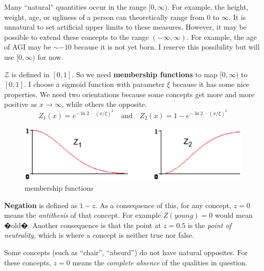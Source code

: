 Many ``natural'' quantities occur in the range $[0,\infty)$.  For example, the height, weight, age, or ugliness of a person can theoretically range from 0 to $\infty$.  It is unnatural to set artificial upper limits to these measures.  However, it may be possible to extend these concepts to the range $(-\infty,\infty)$.  For example, the age of AGI may be $\sim-10$ because it is not yet born.  I reserve this possibility but will use $[0,\infty)$ for now.

$\mathcal{Z}$ is defined in $[0,1]$.  So we need \textbf{membership functions} to map $[0,\infty)$ to $[0,1]$.  I choose a sigmoid function with parameter $\xi$ because it has some nice properties.  We need two orientations because some concepts get more and more positive as $x \rightarrow \infty$, while others the opposite.
\begin{equation}
\label{eqn:Z-squashing-fns}
Z_1(x) = e^{-\ln 2 \; \cdot \; (x/\xi)^2} \quad \mbox{and} \quad Z_2(x) = 1-e^{- \ln 2 \; \cdot \; (x/\xi)^2} 
\end{equation}
\begin{figure}[H]
\centering
\includegraphics[scale=0.9]{MappingFunctions.eps}
\caption{membership functions}
\end{figure}

\textbf{Negation} is defined as $1-z$.  As a consequence of this, for any concept, $z = 0$ means the \textit{antithesis} of that concept.  For example $Z(young) = 0$ would mean �old�. Another consequence is that the point at $z = 0.5$ is the \textit{point of neutrality}, which is where a concept is neither true nor false.

Some concepts (such as ``chair'', ``absurd'') do not have natural opposites.  For these concepts, $z = 0$ means the \textit{complete absence} of the qualities in question.


